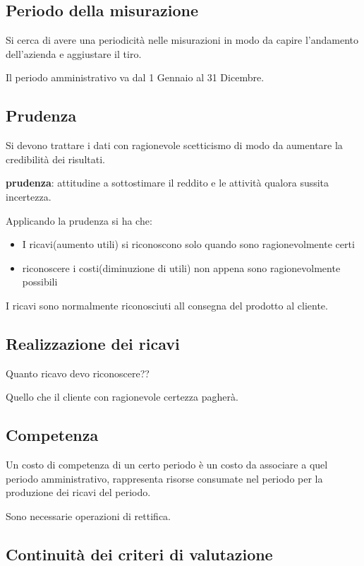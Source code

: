 \subsection{Periodo della misurazione}
Si cerca di avere una periodicità nelle misurazioni in modo da capire l'andamento dell'azienda
e aggiustare il tiro.

Il periodo amministrativo va dal 1 Gennaio al 31 Dicembre.


\subsection{Prudenza}
Si devono trattare i dati con ragionevole scetticismo di modo da aumentare la credibilità dei risultati.


\textbf{prudenza}: attitudine a sottostimare il reddito e le attività
qualora sussita incertezza.

Applicando la prudenza si ha che:
\begin{itemize}
    \item I ricavi(aumento utili) si riconoscono solo quando sono ragionevolmente certi
    \item riconoscere i costi(diminuzione di utili) non appena sono ragionevolmente possibili
\end{itemize}

I ricavi sono normalmente riconosciuti all consegna del prodotto al cliente.



\subsection{Realizzazione dei ricavi}

Quanto ricavo devo riconoscere??

Quello che il cliente con ragionevole certezza pagherà.


\subsection{Competenza}

Un costo di competenza di un certo periodo è un costo da associare a
quel periodo amministrativo, rappresenta risorse consumate nel
periodo per la produzione dei ricavi del periodo.

Sono necessarie operazioni di rettifica.


\subsection{Continuità dei criteri di valutazione}

